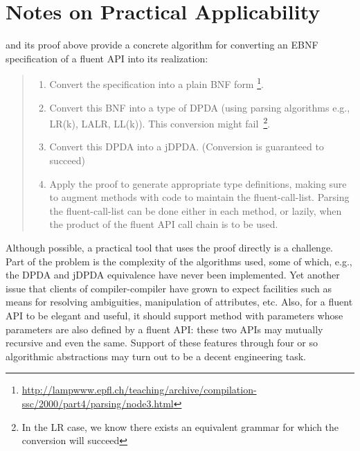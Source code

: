 \documentclass[a4paper,USenglish]{lipics-v2016}
\numberwithin{equation}{section}
\numberwithin{figure}{section}
\newcommand \urlref [1] {\footnote{\url{#1}}}
\begin{document}
\section{Notes on Practical Applicability}
\label{section:applicability}
 and its proof above provide
  a concrete algorithm for converting an EBNF specification of a fluent API into
its realization:
\begin{quote}
  \begin{enumerate}
    \item Convert the specification into a plain BNF form
    \urlref{http://lampwww.epfl.ch/teaching/archive/compilation-ssc/2000/part4/parsing/node3.html}.
    \item Convert this BNF into a type of DPDA (using parsing algorithms e.g., LR(k), LALR\@, LL(k)). 
        This conversion might 
        fail~\footnote{In the LR case, we know\cite{Knuth:65} there exists an equivalent grammar for which the conversion will succeed}.
    \item Convert this DPDA into a jDPDA. (Conversion is guaranteed to succeed)
    \item Apply the proof to generate appropriate \Java type definitions, making sure to
        augment methods with code to maintain the fluent-call-list.
        Parsing the fluent-call-list can be done either in each method,
        or lazily, when the product of the fluent API call chain is to
        be used.
  \end{enumerate}
\end{quote}
Although possible, a practical tool that uses the proof directly 
  is a challenge. 
Part of the problem is the complexity of the 
  algorithms used, some of which, e.g., the DPDA and jDPDA equivalence have never been 
  implemented.
Yet another issue that clients of compiler-compiler have grown to expect 
  facilities such as means for resolving ambiguities, manipulation 
  of attributes, etc.
Also, for a fluent API to be elegant and useful, 
  it should support method with parameters whose parameters are also defined by a  fluent API:
these two APIs may mutually recursive and even the same. 
Support of these features through four or so algorithmic abstractions 
  may turn out to be a decent engineering task.
\end{document}

